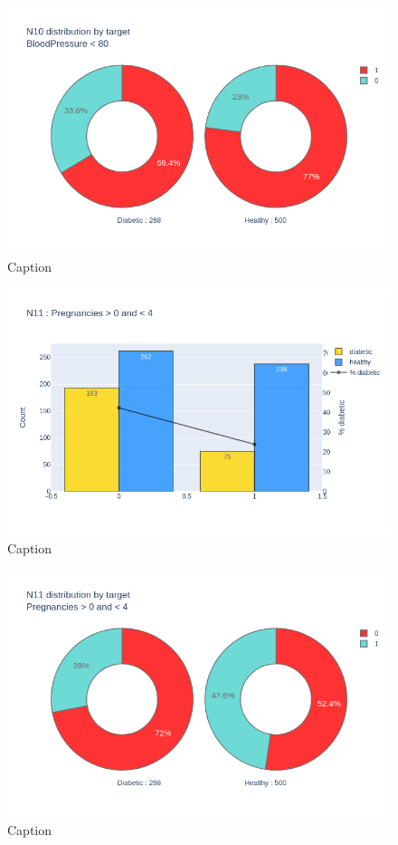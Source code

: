 \documentclass[12pt]{article}
\begin{document}
\begin{figure}[ht]
\centering
\includegraphics[width=1\textwidth]{newplot(35).png}
\caption{\label{fig:44} Caption}
\end{figure}

\begin{figure}[ht]
\centering
\includegraphics[width=1\textwidth]{newplot(37).png}
\caption{\label{fig:45} Caption}
\end{figure}

\begin{figure}[ht]
\centering
\includegraphics[width=1\textwidth]{newplot(38).png}
\caption{\label{fig:46} Caption}
\end{figure}
\end{document}
